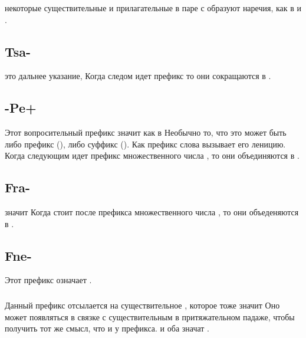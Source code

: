 \subsubsection{} некоторые существительные и прилагательные в паре с  образуют наречия, как в   и  .

\subsection{Tsa-} это дальнее указание,   Когда следом идет префикс  то они сокращаются в 
. 
 

\subsection{-Pe+} \label{morph:pre:pe} Этот вопросительный префикс значит
 как в    Необычно то, что это может быть либо префикс (), либо суффикс ().
Как префикс слова вызывает его леницию. Когда следующим идет префикс множественного числа , то они объединяются в .

\subsection{Fra-} значит   Когда стоит после префикса множественного числа , то они объеденяются в .
 

\subsection{Fne-} Этот префикс означает .

\subsubsection{} Данный префикс отсылается на существительное , которое тоже значит   Оно может появляться в связке с существительным в притяжательном падаже, чтобы получить тот же смысл, что и у префикса.   и
 оба значат .


